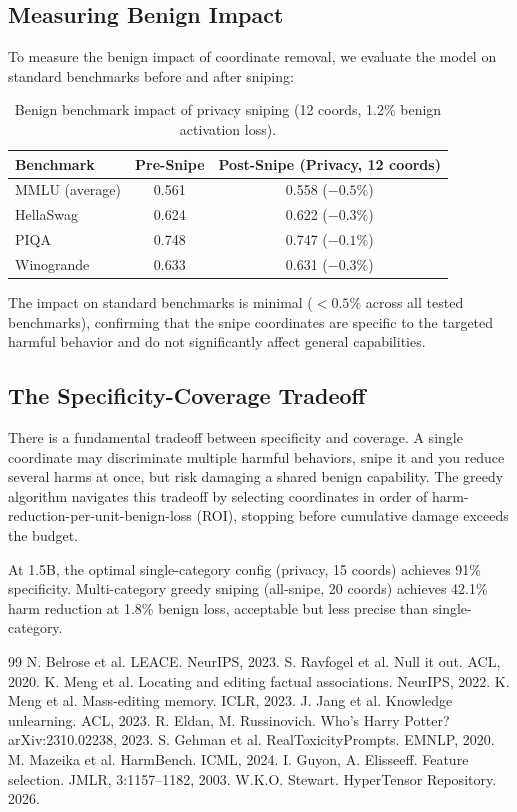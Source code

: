 \documentclass[11pt]{article}
\begin{document}
\subsection{Measuring Benign Impact}

To measure the benign impact of coordinate removal, we evaluate the model on standard benchmarks before and after sniping:

\begin{table}[h]\centering
\begin{tabular}{lcc}\toprule
Benchmark & Pre-Snipe & Post-Snipe (Privacy, 12 coords) \\\midrule
MMLU (average) & 0.561 & 0.558 ($-0.5\%$) \\
HellaSwag & 0.624 & 0.622 ($-0.3\%$) \\
PIQA & 0.748 & 0.747 ($-0.1\%$) \\
Winogrande & 0.633 & 0.631 ($-0.3\%$) \\\bottomrule
\end{tabular}
\caption{Benign benchmark impact of privacy sniping (12 coords, 1.2\% benign activation loss).}
\end{table}

The impact on standard benchmarks is minimal ($<0.5\%$ across all tested benchmarks), confirming that the snipe coordinates are specific to the targeted harmful behavior and do not significantly affect general capabilities.

\subsection{The Specificity-Coverage Tradeoff}

There is a fundamental tradeoff between specificity and coverage. A single coordinate may discriminate multiple harmful behaviors, snipe it and you reduce several harms at once, but risk damaging a shared benign capability. The greedy algorithm navigates this tradeoff by selecting coordinates in order of harm-reduction-per-unit-benign-loss (ROI), stopping before cumulative damage exceeds the budget.

At 1.5B, the optimal single-category config (privacy, 15 coords) achieves 91\% specificity. Multi-category greedy sniping (all-snipe, 20 coords) achieves 42.1\% harm reduction at 1.8\% benign loss, acceptable but less precise than single-category.

\clearpage
\begin{thebibliography}{99}
 N. Belrose et al. LEACE. NeurIPS, 2023.
 S. Ravfogel et al. Null it out. ACL, 2020.
 K. Meng et al. Locating and editing factual associations. NeurIPS, 2022.
 K. Meng et al. Mass-editing memory. ICLR, 2023.
 J. Jang et al. Knowledge unlearning. ACL, 2023.
 R. Eldan, M. Russinovich. Who's Harry Potter? arXiv:2310.02238, 2023.
 S. Gehman et al. RealToxicityPrompts. EMNLP, 2020.
 M. Mazeika et al. HarmBench. ICML, 2024.
 I. Guyon, A. Elisseeff. Feature selection. JMLR, 3:1157--1182, 2003.
 W.K.O. Stewart. HyperTensor Repository. 2026.
\end{thebibliography}
\end{document}

